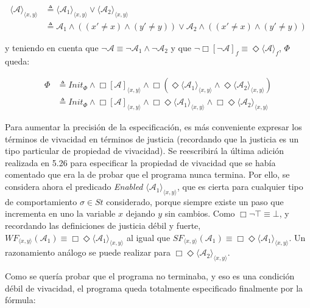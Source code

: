 \begin{align*}
    \langle \mathcal{A} \rangle_{\langle x,y \rangle} &\triangleq \langle \mathcal{A}_1 \rangle_{\langle x,y \rangle} \lor \langle \mathcal{A}_2 \rangle_{\langle x,y \rangle} \\
    &\triangleq \mathcal{A}_1 \land ((x' \neq x) \land (y' \neq y)) \lor \mathcal{A}_2 \land ((x' \neq x) \land (y' \neq y))
\end{align*}

\noindent
y teniendo en cuenta que $\neg \mathcal{A} \equiv \neg \mathcal{A}_1 \land \neg \mathcal{A}_2$ y que $\neg \Box[\neg \mathcal{A}]_f \equiv \Diamond \langle \mathcal{A} \rangle_f$, $\Phi$ queda:

\begin{align}
    \Phi &\triangleq Init_{\Phi} \land \Box [\mathcal{A}]_{\langle x,y \rangle} \land \Box(\Diamond \langle \mathcal{A}_1 \rangle_{\langle x,y \rangle} \land \Diamond \langle \mathcal{A}_2 \rangle_{\langle x,y \rangle} )\\ \nonumber
    &\triangleq Init_{\Phi} \land \Box [\mathcal{A}]_{\langle x,y \rangle} \land \Box\Diamond \langle \mathcal{A}_1 \rangle_{\langle x,y \rangle} \land \Box\Diamond \langle \mathcal{A}_2 \rangle_{\langle x,y \rangle}
\end{align}

Para aumentar la precisión de la especificación, es más conveniente expresar los términos de vivacidad en términos de justicia (recordando que la justicia es un tipo particular de propiedad de vivacidad). Se reescribirá la última adición realizada en 5.26 para especificar la propiedad de vivacidad que se había comentado que era la de probar que el programa nunca termina. Por ello, se considera ahora el predicado \textit{Enabled} $\langle \mathcal{A}_1 \rangle_{\langle x,y \rangle}$, que es cierta para cualquier tipo de comportamiento $\sigma \in St$ considerado, porque  siempre existe un paso que incrementa en uno la variable $x$ dejando $y$ sin cambios. Como $\Box\neg \top \equiv \bot$, y recordando las definiciones de justicia débil y fuerte, $WF_{\langle x,y \rangle}(\mathcal{A}_1) \equiv \Box\Diamond\langle \mathcal{A}_1\rangle_{\langle x,y\rangle}$ al igual que $SF_{\langle x,y\rangle}(\mathcal{A}_1) \equiv \Box\Diamond\langle \mathcal{A}_1\rangle_{\langle x,y\rangle}$. Un razonamiento análogo se puede realizar para $\Box\Diamond\langle \mathcal{A}_2 \rangle_{\langle x,y \rangle}$.

Como se quería probar que el programa no terminaba, y eso es una condición débil de vivacidad, el programa queda totalmente especificado finalmente por la fórmula:

